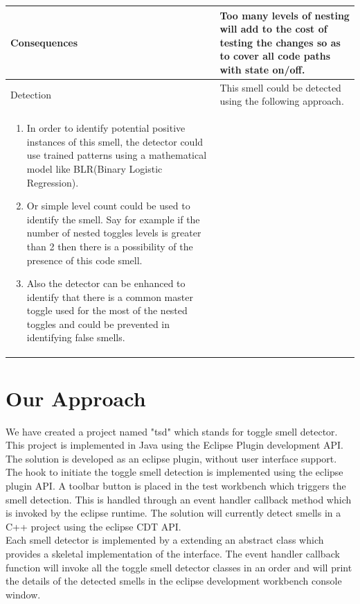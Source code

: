 \documentclass[conference]{IEEEtran}
\begin{document}
\begin{table}[ht]
\begin{tabular}{|p{1.5cm}|p{7cm}|}
 \\ \hline
 Consequences & Too many levels of nesting will add to the cost of testing the changes so as to cover all code paths with state on/off.
 \\ \hline

 Detection & This smell could be detected using the following approach.\\
 \begin{enumerate}
 \item{In order to identify potential positive instances of this smell, the detector could use trained patterns using a mathematical model like BLR(Binary Logistic Regression).}
 \item{Or simple level count could be used to identify the smell. Say for example if the number of nested toggles levels is greater than 2 then there is a possibility of the presence of this code smell.}
 \item{Also the detector can be enhanced to identify that there is a common master toggle used for the most of the nested toggles and could be prevented in identifying false smells.}
 \end{enumerate}
  
 \\ \hline
 
\end{tabular}
\label{table:chrome-dir-data}
\end{table}

\section{Our Approach}
\label{Methodology and Implimentation}
We have created a project named "tsd" which stands for toggle smell detector. This project is implemented in Java using the Eclipse Plugin development API. The solution is developed as an eclipse plugin, without user interface support. The hook to initiate the toggle smell detection is implemented using the eclipse plugin API. A toolbar button is placed in the test workbench which triggers the smell detection. This is handled through an event handler callback method which is invoked by the eclipse runtime. The solution will currently detect smells in a C++ project using the eclipse CDT API.\\

Each smell detector is implemented by a extending an abstract class which provides a skeletal implementation of the interface. The event handler callback function will invoke all the toggle smell detector classes in an order and will print the details of the detected smells in the eclipse development workbench console window.\\
\end{document}
